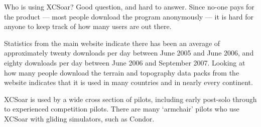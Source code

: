Who is using XCSoar?  Good question, and hard to answer.  Since no-one
pays for the product --- most people download the program anonymously
--- it is hard for anyone to keep track of how many users are out
there.

Statistics from the main website indicate there has been an average of
approximately twenty downloads per day between June 2005 and June
2006, and eighty downloads per day between June 2006 and September
2007.  Looking at how many people download the terrain and topography
data packs from the website indicates that it is used in many
countries and in nearly every continent.

XCSoar is used by a wide cross section of pilots, including early
post-solo through to experienced competition pilots.  There are many
`armchair' pilots who use XCSoar with gliding simulators, such as
Condor.

